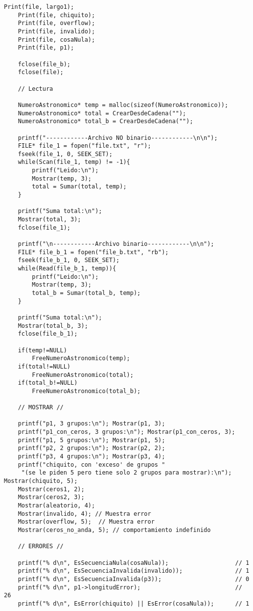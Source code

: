 \documentclass[a4paper, 12pt]{article}
\begin{document}
\begin{lstlisting}[style=C]
    Print(file, largo1);
    Print(file, chiquito);
    Print(file, overflow);
    Print(file, invalido);
    Print(file, cosaNula);
    Print(file, p1);

    fclose(file_b);
    fclose(file);

    // Lectura

    NumeroAstronomico* temp = malloc(sizeof(NumeroAstronomico));
    NumeroAstronomico* total = CrearDesdeCadena("");
    NumeroAstronomico* total_b = CrearDesdeCadena("");

    printf("------------Archivo NO binario------------\n\n");
    FILE* file_1 = fopen("file.txt", "r");
    fseek(file_1, 0, SEEK_SET);
    while(Scan(file_1, temp) != -1){
        printf("Leido:\n");
        Mostrar(temp, 3);
        total = Sumar(total, temp);
    }
    
    printf("Suma total:\n");
    Mostrar(total, 3);
    fclose(file_1);

    printf("\n------------Archivo binario------------\n\n");
    FILE* file_b_1 = fopen("file_b.txt", "rb");
    fseek(file_b_1, 0, SEEK_SET);
    while(Read(file_b_1, temp)){
        printf("Leido:\n");
        Mostrar(temp, 3);
        total_b = Sumar(total_b, temp);
    }
    
    printf("Suma total:\n");
    Mostrar(total_b, 3);
    fclose(file_b_1);

    if(temp!=NULL)
        FreeNumeroAstronomico(temp);
    if(total!=NULL)
        FreeNumeroAstronomico(total);
    if(total_b!=NULL)
        FreeNumeroAstronomico(total_b);
    
    // MOSTRAR //

    printf("p1, 3 grupos:\n"); Mostrar(p1, 3);
    printf("p1_con_ceros, 3 grupos:\n"); Mostrar(p1_con_ceros, 3);
    printf("p1, 5 grupos:\n"); Mostrar(p1, 5);
    printf("p2, 2 grupos:\n"); Mostrar(p2, 2);
    printf("p3, 4 grupos:\n"); Mostrar(p3, 4);
    printf("chiquito, con 'exceso' de grupos "
     "(se le piden 5 pero tiene solo 2 grupos para mostrar):\n"); Mostrar(chiquito, 5);
    Mostrar(ceros1, 2);
    Mostrar(ceros2, 3);
    Mostrar(aleatorio, 4);
    Mostrar(invalido, 4); // Muestra error
    Mostrar(overflow, 5);  // Muestra error
    Mostrar(ceros_no_anda, 5); // comportamiento indefinido

    // ERRORES //

    printf("% d\n", EsSecuenciaNula(cosaNula));                   // 1
    printf("% d\n", EsSecuenciaInvalida(invalido));               // 1
    printf("% d\n", EsSecuenciaInvalida(p3));                     // 0
    printf("% d\n", p1->longitudError);                           // 26
    printf("% d\n", EsError(chiquito) || EsError(cosaNula));      // 1


\end{lstlisting}
\end{document}
